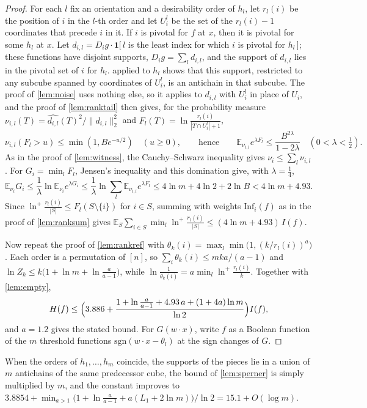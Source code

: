 \documentclass[11pt]{amsart}
\theoremstyle{definition}
\theoremstyle{remark}
\newcommand{\E}{\mathbb{E}}
\newcommand{\Inf}{\mathrm{Inf}}
\begin{document}
\begin{proof}
For each $l$ fix an orientation and a desirability order of $h_l$, let $r_l(i)$ be the position of $i$ in the
$l$-th order and let $U_i^l$ be the set of the $r_l(i)-1$ coordinates that precede $i$ in it. If $i$ is pivotal for
$f$ at $x$, then it is pivotal for some $h_l$ at $x$. Let $d_{i,l}=D_ig\cdot\mathbf 1[\,l$ is the least index for
which $i$ is pivotal for $h_l\,]$; these functions have disjoint supports, $D_ig=\sum_ld_{i,l}$, and the support of
$d_{i,l}$ lies in the pivotal set of $i$ for $h_l$.  applied to $h_l$ shows that this support,
restricted to any subcube spanned by coordinates of $U_i^l$, is an antichain in that subcube. The proof of
\cref{lem:noise} uses nothing else, so it applies to $d_{i,l}$ with $U_i^l$ in place of $U_i$, and the proof of
\cref{lem:ranktail} then gives, for the probability measure $\nu_{i,l}(T)=\widehat{d_{i,l}}(T)^2/\|d_{i,l}\|_2^2$ and
$F_l(T)=\ln\frac{r_l(i)}{|T\cap U_i^l|+1}$,
\[
\nu_{i,l}(F_l>u)\le\min(1,Be^{-u/2})\quad(u\ge0),\qquad\text{hence}\qquad
\E_{\nu_{i,l}}e^{\lambda F_l}\le\frac{B^{2\lambda}}{1-2\lambda}\quad(0<\lambda<\tfrac12).
\]
As in the proof of \cref{lem:witness}, the Cauchy--Schwarz inequality gives $\nu_i\le\sum_l\nu_{i,l}$. For
$G_i=\min_lF_l$, Jensen's inequality and this domination give, with $\lambda=\frac14$,
\[
\E_{\nu_i}G_i\le\frac1\lambda\ln\E_{\nu_i}e^{\lambda G_i}\le\frac1\lambda\ln\sum_l\E_{\nu_{i,l}}e^{\lambda F_l}
\le4\ln m+4\ln2+2\ln B<4\ln m+4.93 .
\]
Since $\ln^+\frac{r_l(i)}{|S|}\le F_l(S\setminus\{i\})$ for $i\in S$, summing with weights $\Inf_i(f)$ as in the
proof of \cref{lem:ranksum} gives $\E_S\sum_{i\in S}\min_l\ln^+\frac{r_l(i)}{|S|}\le(4\ln m+4.93)\,I(f)$.

Now repeat the proof of \cref{lem:rankref} with $\theta_k(i)=\max_l\min\bigl(1,(k/r_l(i))^a\bigr)$. Each order is a
permutation of $[n]$, so $\sum_i\theta_k(i)\le mka/(a-1)$ and $\ln Z_k\le k\bigl(1+\ln m+\ln\frac a{a-1}\bigr)$, while
$\ln\frac1{\theta_k(i)}=a\min_l\ln^+\frac{r_l(i)}k$. Together with \cref{lem:empty},
\[
H(f)\le\Bigl(3.886+\frac{1+\ln\frac a{a-1}+4.93\,a+(1+4a)\ln m}{\ln2}\Bigr)I(f),
\]
and $a=1.2$ gives the stated bound. For $G(w\cdot x)$, write $f$ as a Boolean function of the $m$ threshold
functions $\mathrm{sgn}(w\cdot x-\theta_l)$ at the sign changes of $G$.
\end{proof}

When the orders of $h_1,\dots,h_m$ coincide, the supports of the pieces lie in a union of $m$ antichains of the same
predecessor cube, the bound of \cref{lem:sperner} is simply multiplied by $m$, and the constant improves to
$3.8854+\min_{a>1}\bigl(1+\ln\frac a{a-1}+a(L_1+2\ln m)\bigr)/\ln2=15.1+O(\log m)$.
\end{document}
